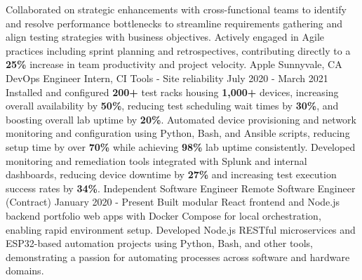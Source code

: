 \documentclass{resume}
\begin{document}
{{        \multibulletitem Collaborated on strategic enhancements with cross-functional teams to identify and resolve performance bottlenecks to streamline requirements gathering and align testing strategies with business objectives. Actively engaged in Agile practices including sprint planning and retrospectives, contributing directly to a \textbf{25\%} increase in team productivity and project velocity.
        \vspace{0.5em}%
    }
    \expdivider
    \experienceItem
    {Apple}
    {Sunnyvale, CA}
    {DevOps Engineer Intern, CI Tools - Site reliability}
    {July 2020 - March 2021}
    {%
        \multibulletitem Installed and configured \textbf{200+} test racks housing \textbf{1,000+} devices, increasing overall availability by \textbf{50\%}, reducing test scheduling wait times by \textbf{30\%}, and boosting overall lab uptime by \textbf{20\%}.
        \multibulletitem Automated device provisioning and network monitoring and configuration using Python, Bash, and Ansible scripts, reducing setup time by over \textbf{70\%} while achieving \textbf{98\%} lab uptime consistently.
        \multibulletitem Developed monitoring and remediation tools integrated with Splunk and internal dashboards, reducing device downtime by \textbf{27\%} and increasing test execution success rates by \textbf{34\%}.
    }
    \expdivider
    \experienceItem
    {Independent Software Engineer}
    {Remote}
    {Software Engineer (Contract)}
    {January 2020 - Present}
    {%
        \singlebulletitem Built modular React frontend and Node.js backend portfolio web apps with Docker Compose for local orchestration, enabling rapid environment setup.
        \singlebulletitem Developed Node.js RESTful microservices and ESP32-based automation projects using Python, Bash, and other tools, demonstrating a passion for automating processes across software and hardware domains.
    }

}

\end{document}
